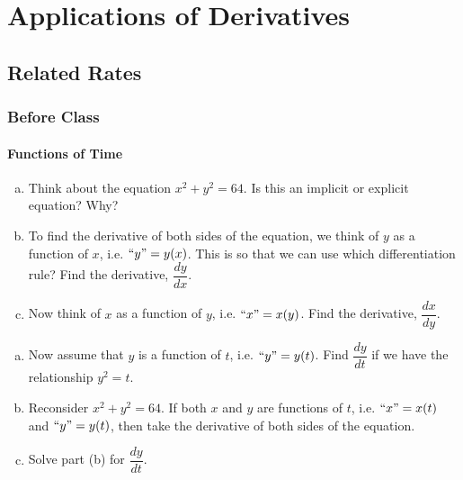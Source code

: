 \documentclass[notes]{subfiles}
\begin{document}
	\chapter{Applications of Derivatives}
	\setcounter{section}{1}
	\fancyhead[LO,RE]{\bfseries \currentname}
	\fancyfoot[C]{{}}
	\fancyfoot[LO,RE]{\large \thepage}	%

\section*{Related Rates}\label{cs41}
	\subsection*{Before Class}
	\subsubsection*{Functions of Time}
		\begin{ex}
			\begin{enumerate}[(a)]
				\item Think about the equation \(x^2 + y^2 = 64\).  Is this an implicit or explicit equation?  Why?
					
				\item To find the derivative of both sides of the equation, we think of \(y\) as a function of \(x\), i.e. \(``y\text{''} = y(x)\).  This is so that we can use which differentiation rule?  Find the derivative, \(\dfrac{dy}{dx}\).
					
				\item Now think of $x$ as a function of \(y\), i.e. \(``x\text{''} =x(y)\).  Find the derivative, \(\dfrac{dx}{dy}\).  
					
			\end{enumerate}
		\end{ex}
		
		\begin{ex}
			\begin{enumerate}[(a)]
				\item Now assume that \(y\) is a function of \(t\), i.e. \(``y\text{''} = y(t)\).  Find \(\dfrac{dy}{dt}\) if we have the relationship \(y^2 = t\).
					\vs{1}
					\newpage
					
				\item Reconsider \(x^2 + y^2 = 64\).  If both \(x\) and \(y\) are functions of \(t\), i.e. \(``x\text{''} =x(t)\) and \(``y\text{''} =y(t)\), then take the derivative of both sides of the equation.
					\vs{1}
					
				\item Solve part (b) for \(\dfrac{dy}{dt}\).
					\vs{1}
					
			\end{enumerate}
		\end{ex}
		
\end{document}
